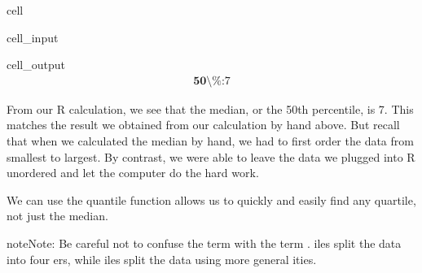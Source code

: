 \documentclass[letterpaper,10pt,english]{jupyterBook}
\begin{document}
\begin{sphinxuseclass}{cell}\begin{sphinxVerbatimInput}

\begin{sphinxuseclass}{cell_input}
\begin{sphinxVerbatim}[commandchars=\\\{\}]

\end{sphinxVerbatim}

\end{sphinxuseclass}\end{sphinxVerbatimInput}
\begin{sphinxVerbatimOutput}

\begin{sphinxuseclass}{cell_output}\begin{equation*}
\begin{split}\textbf{50\textbackslash{}\%:} 7\end{split}
\end{equation*}
\end{sphinxuseclass}\end{sphinxVerbatimOutput}

\end{sphinxuseclass}
\sphinxAtStartPar
From our R calculation, we see that the median, or the 50th percentile, is 7. This matches the result we obtained from our calculation by hand above. But recall that when we calculated the median by hand, we had to first order the data from smallest to largest. By contrast, we were able to leave the data we plugged into R unordered and let the computer do the hard work.

\sphinxAtStartPar
We can use the quantile function allows us to quickly and easily find any quartile, not just the median.

\begin{sphinxadmonition}{note}{Note:}
\sphinxAtStartPar
Be careful not to confuse the term  with the term . iles split the data into four ers, while iles split the data using more general ities.
\end{sphinxadmonition}
\end{document}
